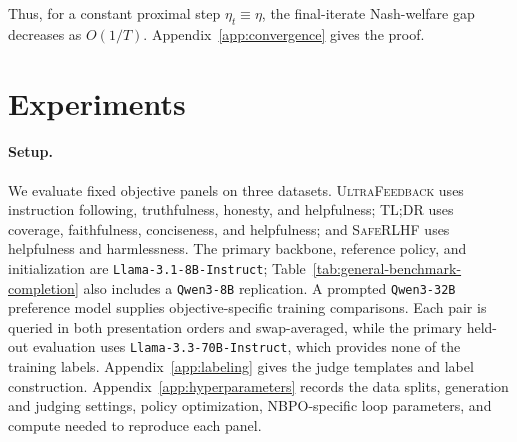 \documentclass{article}
\theoremstyle{remark}
\theoremstyle{plain}
\begin{document}
Thus, for a constant proximal step $\eta_t\equiv\eta$, the final-iterate
Nash-welfare gap decreases as $O(1/T)$. Appendix~\ref{app:convergence} gives
the proof.

\section{Experiments}
\label{sec:experiments}
\paragraph{Setup.}
We evaluate fixed objective panels on three datasets. \textsc{UltraFeedback} uses instruction following, truthfulness, honesty, and helpfulness; \textsc{TL;DR} uses coverage, faithfulness, conciseness, and helpfulness; and \textsc{SafeRLHF} uses helpfulness and harmlessness. The primary backbone, reference policy, and initialization are \texttt{Llama-3.1-8B-Instruct}; Table~\ref{tab:general-benchmark-completion} also includes a \texttt{Qwen3-8B} replication. A prompted \texttt{Qwen3-32B} preference model supplies objective-specific training comparisons. Each pair is queried in both presentation orders and swap-averaged, while the primary held-out evaluation uses \texttt{Llama-3.3-70B-Instruct}, which provides none of the training labels. Appendix~\ref{app:labeling} gives the judge templates and label construction. Appendix~\ref{app:hyperparameters} records the data splits, generation and judging settings, policy optimization, NBPO-specific loop parameters, and compute needed to reproduce each panel.
\end{document}
